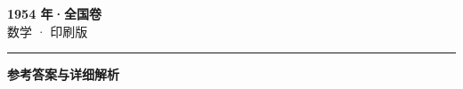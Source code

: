 \documentclass[zihao=5, a4paper]{ctexart}
\begin{document}
\begin{center}
  {\Large\bfseries 1954 年·全国卷}\\[4pt]
  {\large 数学 · 印刷版}
\end{center}
\medskip
{}

\par\bigskip\hrule\bigskip
{}
\begin{center}{\large\bfseries 参考答案与详细解析}\end{center}
\smallskip

\end{document}
